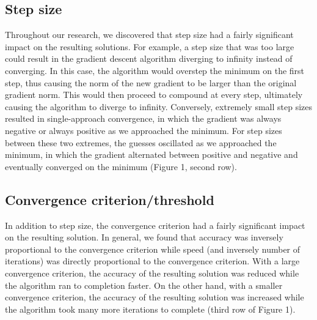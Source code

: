 \documentclass{article}
\begin{document}
\subsection{Step size}
Throughout our research, we discovered that step size had a fairly significant impact on the resulting solutions. For example, a step size that was too large could result in the gradient descent algorithm diverging to infinity instead of converging. In this case, the algorithm would overstep the minimum on the first step, thus causing the norm of the new gradient to be larger than the original gradient norm. This would then proceed to compound at every step, ultimately causing the algorithm to diverge to infinity. Conversely, extremely small step sizes resulted in single-approach convergence, in which the gradient was always negative or always positive as we approached the minimum. For step sizes between these two extremes, the guesses oscillated as we approached the minimum, in which the gradient alternated between positive and negative and eventually converged on the minimum (Figure 1, second row).

\subsection{Convergence criterion/threshold}
In addition to step size, the convergence criterion had a fairly significant impact on the resulting solution. In general, we found that accuracy was inversely proportional to the convergence criterion while speed (and inversely number of iterations) was directly proportional to the convergence criterion. With a large convergence criterion, the accuracy of the resulting solution was reduced while the algorithm ran to completion faster. On the other hand, with a smaller convergence criterion, the accuracy of the resulting solution was increased while the algorithm took many more iterations to complete (third row of Figure 1). \\ \\
\end{document}
